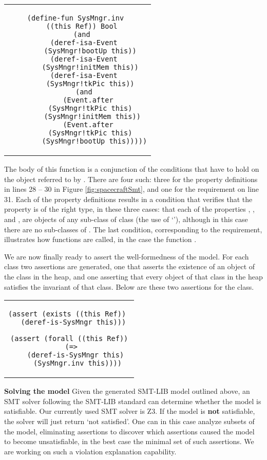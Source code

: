 \begin{center}
\begin{tabular}{c}
\small
\begin{lstlisting}
(define-fun SysMngr.inv 
  ((this Ref)) Bool
  (and
    (deref-isa-Event 
      (SysMngr!bootUp this))
    (deref-isa-Event 
      (SysMngr!initMem this))
    (deref-isa-Event 
      (SysMngr!tkPic this))
    (and 
      (Event.after 
        (SysMngr!tkPic this)  
        (SysMngr!initMem this)) 
      (Event.after 
        (SysMngr!tkPic this)  
        (SysMngr!bootUp this)))))
\end{lstlisting}
\end{tabular}
\end{center}

\noindent The body of this function is a conjunction of the conditions
that have to hold on the  object referred to by
. There are four such: three for the property definitions
in lines 28 -- 30 in Figure \ref{fig:spacecraftSmt}, and one for the
requirement on line 31. Each of the property definitions results in a
condition that verifies that the property is of the right type, in
these three cases: that each of the properties ,
, and , are objects of any sub-class of
class  (the use of `'), although in this case
there are no sub-classes of . The last condition,
corresponding to the requirement, illustrates how functions are called,
in the case the function .

We are now finally ready to assert the well-formedness of the
model. For each class two assertions are generated, one that asserts
the existence of an object of the class in the heap, and one asserting
that every object of that class in the heap satisfies the invariant of
that class. Below are these two assertions for the 
class.

\begin{center}
\begin{tabular}{c}
\small
\begin{lstlisting}
(assert (exists ((this Ref)) 
  (deref-is-SysMngr this)))

(assert (forall ((this Ref))
  (=> 
    (deref-is-SysMngr this) 
    (SysMngr.inv this))))
\end{lstlisting}
\end{tabular}
\end{center}

\textbf{Solving the model} Given the generated SMT-LIB model outlined
above, an SMT solver following the SMT-LIB standard can determine
whether the model is satisfiable. Our currently used SMT solver is
Z3. If the model is {\bf not} satisfiable, the solver will just return
`not satisfied'. One can in this case analyze subsets of the model,
eliminating assertions to discover which assertions caused the model
to become unsatisfiable, in the best case the minimal set of such
assertions. We are working on such a violation explanation capability.


